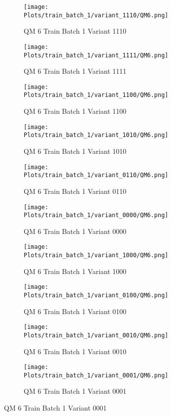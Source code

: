 \documentclass{DissertateFigs}
\begin{document}
\begin{figure}[t!]
    \begin{subfigure}{0.47\textwidth}
    \texttt{[image: Plots/train\_batch\_1/variant\_1110/QM6.png]}
    \caption{QM 6 Train Batch 1 Variant 1110}
    \end{subfigure}
    \begin{subfigure}{0.47\textwidth}
    \texttt{[image: Plots/train\_batch\_1/variant\_1111/QM6.png]}
    \caption{QM 6 Train Batch 1 Variant 1111}
    \end{subfigure}

\medskip

    \begin{subfigure}{0.47\textwidth}
    \texttt{[image: Plots/train\_batch\_1/variant\_1100/QM6.png]}
    \caption{QM 6 Train Batch 1 Variant 1100}
    \end{subfigure}
    \begin{subfigure}{0.47\textwidth}
    \texttt{[image: Plots/train\_batch\_1/variant\_1010/QM6.png]}
    \caption{QM 6 Train Batch 1 Variant 1010}
    \end{subfigure}

\medskip

    \begin{subfigure}{0.47\textwidth}
    \texttt{[image: Plots/train\_batch\_1/variant\_0110/QM6.png]}
    \caption{QM 6 Train Batch 1 Variant 0110}
    \end{subfigure}
    \begin{subfigure}{0.47\textwidth}
    \texttt{[image: Plots/train\_batch\_1/variant\_0000/QM6.png]}
    \caption{QM 6 Train Batch 1 Variant 0000}
    \end{subfigure}

\medskip

    \begin{subfigure}{0.47\textwidth}
    \texttt{[image: Plots/train\_batch\_1/variant\_1000/QM6.png]}
    \caption{QM 6 Train Batch 1 Variant 1000}
    \end{subfigure}
    \begin{subfigure}{0.47\textwidth}
    \texttt{[image: Plots/train\_batch\_1/variant\_0100/QM6.png]}
    \caption{QM 6 Train Batch 1 Variant 0100}
    \end{subfigure}

\medskip

    \begin{subfigure}{0.47\textwidth}
    \texttt{[image: Plots/train\_batch\_1/variant\_0010/QM6.png]}
    \caption{QM 6 Train Batch 1 Variant 0010}
    \end{subfigure}
    \begin{subfigure}{0.47\textwidth}
    \texttt{[image: Plots/train\_batch\_1/variant\_0001/QM6.png]}
    \caption{QM 6 Train Batch 1 Variant 0001}
    \end{subfigure}


\end{figure}
\end{document}
